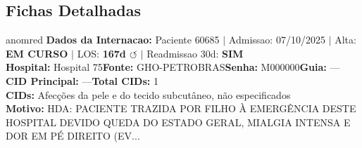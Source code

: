 \documentclass[a4paper,10pt]{article}
\begin{document}
\subsection{Fichas Detalhadas}
\begin{anomalycard}[Internacao 150288 | GHO-PETROBRAS | CRITICO (z=6.45)]{anomred}
\textbf{Dados da Internacao:} Paciente 60685 $\mid$ Admissao: 07/10/2025 $\mid$ Alta: \textcolor{anomorange}{\textbf{EM CURSO}} $\mid$ LOS: \textbf{167d \textcolor{anomorange}{$\circlearrowleft$}} $\mid$ Readmissao 30d: \textcolor{anomred}{\textbf{SIM}}\\
\textbf{Hospital:} Hospital 75\quad\textbf{Fonte:} GHO-PETROBRAS\quad\textbf{Senha:} M000000\quad\textbf{Guia:} ---\\
\textbf{CID Principal:} {\small ---}\quad\textbf{Total CIDs:} 1\\

\textbf{CIDs:} {\scriptsize Afecções da pele e do tecido subcutâneo, não especificados}\\

\textbf{Motivo:} {\scriptsize HDA: PACIENTE TRAZIDA POR FILHO À EMERGÊNCIA DESTE HOSPITAL DEVIDO QUEDA DO ESTADO GERAL, MIALGIA INTENSA E DOR EM PÉ DIREITO (EV...}\\


\end{anomalycard}
\end{document}
